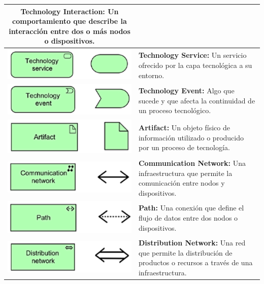 \begin{longtable}{|c|p{8cm}|}
\textbf{Technology Interaction:} Un comportamiento que describe la interacción entre dos o más nodos o dispositivos. \\
\hline
\includegraphics{anexos/ARCHI/technology/service.png} & 
\textbf{Technology Service:} Un servicio ofrecido por la capa tecnológica a su entorno. \\
\hline
\includegraphics{anexos/ARCHI/technology/event.png} & 
\textbf{Technology Event:} Algo que sucede y que afecta la continuidad de un proceso tecnológico. \\
\hline
\includegraphics{anexos/ARCHI/technology/artifact.png} & 
\textbf{Artifact:} Un objeto físico de información utilizado o producido por un proceso de tecnología. \\
\hline
\includegraphics{anexos/ARCHI/technology/network.png} & 
\textbf{Communication Network:} Una infraestructura que permite la comunicación entre nodos y dispositivos. \\
\hline
\includegraphics{anexos/ARCHI/technology/path.png} & 
\textbf{Path:} Una conexión que define el flujo de datos entre dos nodos o dispositivos. \\
\hline
\includegraphics{anexos/ARCHI/technology/distribution.png} & 
\textbf{Distribution Network:} Una red que permite la distribución de productos o recursos a través de una infraestructura. \\
\hline
\end{longtable}

